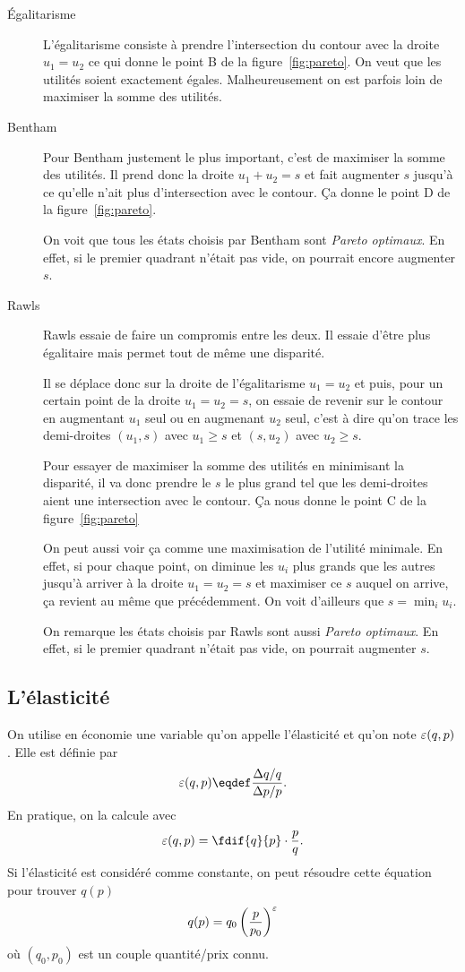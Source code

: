 \begin{description}
  \item[Égalitarisme]
    L'égalitarisme consiste à prendre l'intersection du contour
    avec la droite $u_1 = u_2$ ce qui donne le point B
    de la figure~\ref{fig:pareto}.
    On veut que les utilités soient exactement égales.
    Malheureusement on est parfois loin de maximiser la somme des
    utilités.
  \item[Bentham]
    Pour Bentham justement le plus important, c'est de maximiser la somme
    des utilités.
    Il prend donc la droite $u_1 + u_2 = s$ et fait augmenter $s$ jusqu'à
    ce qu'elle n'ait plus d'intersection avec le contour.
    Ça donne le point D de la figure~\ref{fig:pareto}.

    On voit que tous les états choisis par Bentham sont
    \emph{Pareto optimaux}.
    En effet, si le premier quadrant n'était pas vide, on pourrait
    encore augmenter $s$.
  \item[Rawls]
    Rawls essaie de faire un compromis entre les deux.
    Il essaie d'être plus égalitaire mais permet tout de même une disparité.

    Il se déplace donc sur la droite de l'égalitarisme $u_1 = u_2$
    et puis, pour un certain point de la droite $u_1 = u_2 = s$,
    on essaie de revenir sur le contour en augmentant $u_1$ seul ou en
    augmenant $u_2$ seul, c'est à dire qu'on trace les demi-droites
    $(u_1,s)$ avec $u_1 \geq s$ et $(s,u_2)$ avec $u_2 \geq s$.

    Pour essayer de maximiser la somme des utilités en minimisant la
    disparité, il va donc prendre le $s$ le plus grand tel que les demi-droites
    aient une intersection avec le contour.
    Ça nous donne le point C de la figure~\ref{fig:pareto}

    On peut aussi voir ça comme une maximisation de l'utilité minimale.
    En effet, si pour chaque point, on diminue les $u_i$ plus grands
    que les autres jusqu'à arriver à la droite $u_1 = u_2 = s$ et maximiser
    ce $s$ auquel on arrive, ça revient au même que précédemment.
    On voit d'ailleurs que $s = \min_i u_i$.

    On remarque les états choisis par Rawls sont aussi
    \emph{Pareto optimaux}.
    En effet, si le premier quadrant n'était pas vide,
    on pourrait augmenter $s$.
\end{description}

\subsection{L'élasticité}
On utilise en économie une variable qu'on appelle l'élasticité et qu'on note
$\varepsilon(q,p)$. Elle est définie par
\begin{equation}
  \label{eq:elasticity}
  \elasticity(q,p) \eqdef \frac{\Delta q/q}{\Delta p/p}.
\end{equation}
En pratique, on la calcule avec
\[ \elasticity(q,p) = \fdif{q}{p}\cdot \frac{p}{q}. \]
Si l'élasticité est considéré comme constante, on peut
résoudre cette équation pour trouver $q(p)$
\[ q(p) = q_0\left(\frac{p}{p_0}\right)^\varepsilon \]
où $(q_0, p_0)$ est un couple quantité/prix connu.

